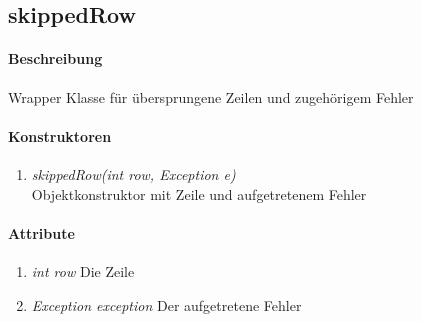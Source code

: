 \subsection{skippedRow}

\paragraph{Beschreibung}
Wrapper Klasse für übersprungene Zeilen und zugehörigem Fehler

\paragraph{Konstruktoren}
\begin{enumerate}[+]
	\item \textit{skippedRow(int row, Exception e)} \\ Objektkonstruktor mit Zeile und aufgetretenem Fehler
\end{enumerate}

\paragraph{Attribute}

\begin{enumerate}[$\bullet$]
	\item \textit{int row} Die Zeile
	\item \textit{Exception exception} Der aufgetretene Fehler
\end{enumerate}

